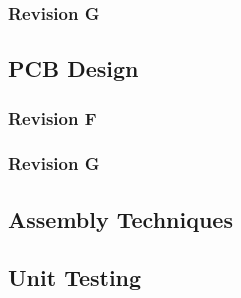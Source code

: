 \subsubsection{Revision G} \label{sssec:rev_g_sch}

\subsection{PCB Design} \label{sec:pcb}

\subsubsection{Revision F} \label{sssec:rev_f_pcb}

\subsubsection{Revision G} \label{sssec:rev_g_pcb}

\subsection{Assembly Techniques} \label{ssec:assembly_techniques}

\subsection{Unit Testing} \label{ssec:unit_testing}